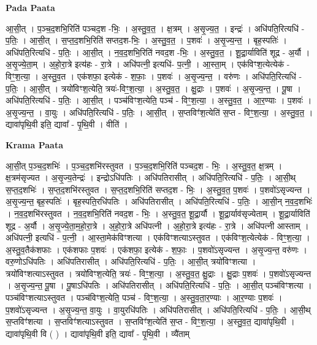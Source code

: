 \documentclass[17pt]{extarticle}
\begin{document}
\textbf{Pada Paata} \newline

आ॒सी॒त् । प॒ञ्च॒द॒शभि॒रिति॑ पञ्चद॒श -भिः॒ । अ॒स्तु॒व॒त॒ । क्ष॒त्रम् । अ॒सृ॒ज्य॒त॒ । इन्द्रः॑ । अधि॑पति॒रित्यधि॑ - प॒तिः॒ । आ॒सी॒त् । स॒प्त॒द॒शभि॒रिति॑ सप्तद॒श-भिः॒ । अ॒स्तु॒व॒त॒ । प॒शवः॑ । अ॒सृ॒ज्य॒न्त॒ । बृह॒स्पतिः॑ । अधि॑पति॒रित्यधि॑ - प॒तिः॒ । आ॒सी॒त् । न॒व॒द॒शभि॒रिति॑ नवद॒श -भिः॒ । अ॒स्तु॒व॒त॒ । शू॒द्रा॒र्याविति॑ शूद्र - अ॒र्यौ । अ॒सृ॒ज्ये॒ता॒म् । अ॒हो॒रा॒त्रे इत्य॑हः - रा॒त्रे । अधि॑पत्नी॒ इत्यधि॑- प॒त्नी॒ । आ॒स्ता॒म् । एक॑विꣳश॒त्येत्येक॑ - विꣳ॒॒श॒त्या॒ । अ॒स्तु॒व॒त । एक॑शफा॒ इत्येक॑ - श॒फाः॒ । प॒शवः॑ । अ॒सृ॒ज्य॒न्त॒ । वरु॑णः । अधि॑पति॒रित्यधि॑ - प॒तिः॒ । आ॒सी॒त् । त्रयो॑विꣳश॒त्येति॒ त्रयः॑-विꣳ॒॒श॒त्या॒ । अ॒स्तु॒व॒त॒ । क्षु॒द्राः । प॒शवः॑ । अ॒सृ॒ज्य॒न्त॒ । पू॒षा । अधि॑पति॒रित्यधि॑ - प॒तिः॒ । आ॒सी॒त् । पञ्च॑विꣳश॒त्येति॒ पञ्च॑ - विꣳ॒॒श॒त्या॒ । अ॒स्तु॒व॒त॒ । आ॒र॒ण्याः । प॒शवः॑ । अ॒सृ॒ज्य॒न्त॒ । वा॒युः । अधि॑पति॒रित्यधि॑ - प॒तिः॒ । आ॒सी॒त् । स॒प्तविꣳ॑श॒त्येति॑ स॒प्त - विꣳ॒॒श॒त्या॒ । अ॒स्तु॒व॒त॒ । द्यावा॑पृथि॒वी इति॒ द्यावा᳚ - पृ॒थि॒वी । वीति॑ ।  \newline


\textbf{Krama Paata} \newline

आ॒सी॒त् प॒ञ्च॒द॒शभिः॑ । प॒ञ्च॒द॒शभि॑रस्तुवत । प॒ञ्च॒द॒शभि॒रिति॑ पञ्चद॒श - भिः॒ । अ॒स्तु॒व॒त॒ क्ष॒त्रम् । क्ष॒त्रम॑सृज्यत । अ॒सृ॒ज्य॒तेन्द्रः॑ । इन्द्रोऽधि॑पतिः । अधि॑पतिरासीत् । अधि॑पति॒रित्यधि॑ - प॒तिः॒ । आ॒सी॒थ् स॒प्त॒द॒शभिः॑ । स॒प्त॒द॒शभि॑रस्तुवत । स॒प्त॒द॒शभि॒रिति॑ सप्तद॒श - भिः॒ । अ॒स्तु॒व॒त॒ प॒शवः॑ । प॒शवो॑ऽसृज्यन्त । अ॒सृ॒ज्य॒न्त॒ बृह॒स्पतिः॑ । बृह॒स्पति॒रधि॑पतिः । अधि॑पतिरासीत् । अधि॑पति॒रित्यधि॑ - प॒तिः॒ । आ॒सी॒न् न॒व॒द॒शभिः॑ । न॒व॒द॒शभि॑रस्तुवत । न॒व॒द॒शभि॒रिति॑ नवद॒श - भिः॒ । अ॒स्तु॒व॒त॒ शू॒द्रा॒र्यौ । शू॒द्रा॒र्याव॑सृज्येताम् । शू॒द्रा॒र्याविति॑ शूद्र - अ॒र्यौ । अ॒सृ॒ज्ये॒ता॒म॒हो॒रा॒त्रे । अ॒हो॒रा॒त्रे अधि॑पत्नी । अ॒हो॒रा॒त्रे इत्य॑हः - रा॒त्रे । अधि॑पत्नी आस्ताम् । अधि॑पत्नी॒ इत्यधि॑ - प॒त्नी॒ । आ॒स्ता॒मेक॑विꣳशत्या । एक॑विꣳशत्याऽस्तुवत । एक॑विꣳश॒त्येत्येक॑ - विꣳ॒॒श॒त्या॒ । अ॒स्तु॒व॒तैक॑शफाः । एक॑शफाः प॒शवः॑ । एक॑शफा॒ इत्येक॑ - श॒फाः॒ । प॒शवो॑ऽसृज्यन्त । अ॒सृ॒ज्य॒न्त॒ वरु॑णः । वरु॒णोऽधि॑पतिः । अधि॑पतिरासीत् । अधि॑पति॒रित्यधि॑ - प॒तिः॒ । आ॒सी॒त् त्रयो॑विꣳशत्या । त्रयो॑विꣳशत्याऽस्तुवत । त्रयो॑विꣳश॒त्येति॒ त्रयः॑ - विꣳ॒॒श॒त्या॒ । अ॒स्तु॒व॒त॒ क्षु॒द्राः । क्षु॒द्राः प॒शवः॑ । प॒शवो॑ऽसृज्यन्त । अ॒सृ॒ज्य॒न्त॒ पू॒षा । पू॒षाऽधि॑पतिः । अधि॑पतिरासीत् । अधि॑पति॒रित्यधि॑ - प॒तिः॒ । आ॒सी॒त् पञ्च॑विꣳशत्या । पञ्च॑विꣳशत्याऽस्तुवत । पञ्च॑विꣳश॒त्येति॒ पञ्च॑ - विꣳ॒॒श॒त्या॒ । अ॒स्तु॒व॒ता॒र॒ण्याः । आ॒र॒ण्याः प॒शवः॑ । प॒शवो॑ऽसृज्यन्त । अ॒सृ॒ज्य॒न्त॒ वा॒युः । वा॒युरधि॑पतिः । अधि॑पतिरासीत् । अधि॑पति॒रित्यधि॑ - प॒तिः॒ । आ॒सी॒थ् स॒प्तविꣳ॑शत्या । स॒प्तविꣳ॑शत्याऽस्तुवत । स॒प्तविꣳ॑श॒त्येति॑ स॒प्त - विꣳ॒॒श॒त्या॒ । अ॒स्तु॒व॒त॒ द्यावा॑पृथि॒वी । द्यावा॑पृथि॒वी वि ( ) । द्यावा॑पृथि॒वी इति॒ द्यावा᳚ - पृ॒थि॒वी । व्यै॑ताम् \newline
\end{document}
